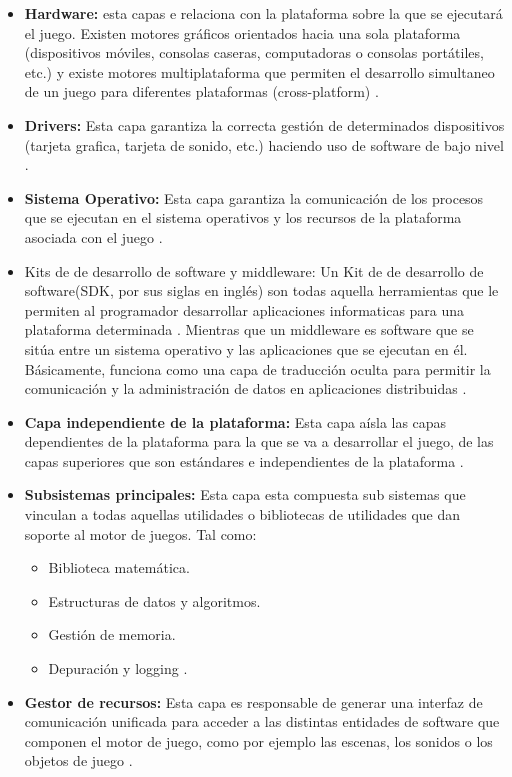  \begin{itemize}
 	\item \textbf{Hardware:} esta capas e relaciona con la plataforma sobre la que se ejecutará el juego. Existen motores gráficos orientados hacia una sola plataforma (dispositivos móviles, consolas caseras, computadoras o consolas portátiles, etc.) y existe motores multiplataforma que permiten el desarrollo simultaneo de un juego para diferentes plataformas (cross-platform) \cite{Ref:ArquMotor}.
 	\item \textbf{Drivers:} Esta capa garantiza la correcta gestión de determinados dispositivos (tarjeta grafica, tarjeta de sonido, etc.) haciendo uso de software de bajo nivel \cite{Ref:ArquMotor}. 
 	\item \textbf{Sistema Operativo:} Esta capa garantiza la comunicación de los procesos que se ejecutan en el sistema operativos y los recursos de la plataforma asociada con el juego \cite{Ref:ArquMotor}.
 	\item {Kits de de desarrollo de software y middleware:} Un Kit de de desarrollo de software(SDK, por sus siglas en inglés) son todas aquella herramientas que le permiten al programador desarrollar aplicaciones informaticas para una plataforma determinada \cite{ref:SDK}. Mientras que un middleware es software que se sitúa entre un sistema operativo y las aplicaciones que se ejecutan en él. Básicamente, funciona como una capa de traducción oculta para permitir la comunicación y la administración de datos en aplicaciones distribuidas \cite{Ref:middleware}. 
 	\item \textbf{Capa independiente de la plataforma:} Esta capa aísla las capas dependientes de la plataforma para la que se va a desarrollar el juego, de las capas superiores que son estándares e independientes de la plataforma \cite{Ref:ArquMotor}. 
 	\item \textbf{Subsistemas principales:} Esta capa esta compuesta sub sistemas que vinculan a todas aquellas utilidades o bibliotecas de utilidades que dan soporte al motor de juegos. Tal como:
 	\begin{itemize}
 		\item Biblioteca matemática.
 		\item Estructuras de datos y algoritmos.
 		\item Gestión de memoria.
 		\item Depuración y logging \cite{Ref:ArquMotor}.
 	\end{itemize}
 	\item \textbf{Gestor de recursos:} Esta capa es responsable de generar una interfaz de comunicación unificada para acceder a las distintas entidades de software que componen el motor de juego, como por ejemplo las escenas, los sonidos o los objetos de juego \cite{Ref:ArquMotor}.

\end{itemize}
